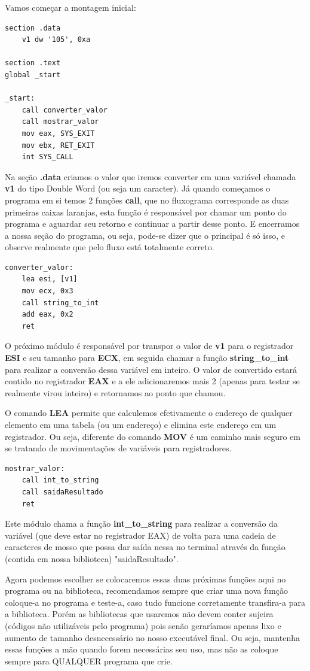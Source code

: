 Vamos começar a montagem inicial:
\begin{lstlisting}[]
section .data
	v1 dw '105', 0xa

section .text
global _start

_start:
	call converter_valor
	call mostrar_valor
	mov eax, SYS_EXIT
	mov ebx, RET_EXIT
	int SYS_CALL
\end{lstlisting}

Na seção \textbf{.data} criamos o valor que iremos converter em uma variável chamada \textbf{v1} do tipo Double Word (ou seja um caracter). Já quando começamos o programa em si temos 2 funções \textbf{call}, que no fluxograma corresponde as duas primeiras caixas laranjas, esta função é responsável por chamar um ponto do programa e aguardar seu retorno e continuar a partir desse ponto. E encerramos a nossa seção do programa, ou seja, pode-se dizer que o principal é só isso, e observe realmente que pelo fluxo está totalmente correto.

\begin{lstlisting}[]
converter_valor:
	lea esi, [v1]
	mov ecx, 0x3
	call string_to_int
	add eax, 0x2
	ret
\end{lstlisting}

O próximo módulo é responsável por transpor o valor de \textbf{v1} para o registrador \textbf{ESI} e seu tamanho para \textbf{ECX}, em seguida chamar a função \textbf{string\_to\_int} para realizar a conversão dessa variável em inteiro. O valor de convertido estará contido no registrador \textbf{EAX} e a ele adicionaremos mais 2 (apenas para testar se realmente virou inteiro) e retornamos ao ponto que chamou.

O comando \textbf{LEA} permite que calculemos efetivamente o endereço de qualquer elemento em uma tabela (ou um endereço) e elimina este endereço em um registrador. Ou seja, diferente do comando \textbf{MOV} é um caminho mais seguro em se tratando de movimentações de variáveis para registradores.

\begin{lstlisting}[]
mostrar_valor:
	call int_to_string
	call saidaResultado
	ret
\end{lstlisting}

Este módulo chama a função \textbf{int\_to\_string} para realizar a conversão da variável (que deve estar no registrador EAX) de volta para uma cadeia de caracteres de mosso que possa dar saída nessa no terminal através da função (contida em nossa biblioteca) "saidaResultado".

Agora podemos escolher se colocaremos essas duas próximas funções aqui no programa ou na biblioteca, recomendamos sempre que criar uma nova função coloque-a no programa e teste-a, caso tudo funcione corretamente transfira-a para a biblioteca. Porém as bibliotecas que usaremos não devem conter sujeira (códigos não utilizáveis pelo programa) pois senão geraríamos apenas lixo e aumento de tamanho desnecessário no nosso executável final. Ou seja, mantenha essas funções a mão quando forem necessárias seu uso, mas não as coloque sempre para QUALQUER programa que crie.


